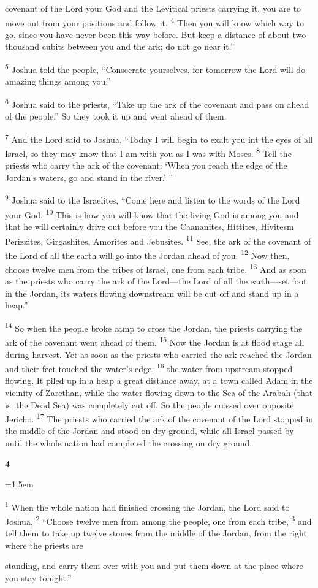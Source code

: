 \documentclass[12pt,twoside]{article}
\newcommand{\vs}[1]{\textsuperscript{#1}}
\newcommand{\chapterWithIndent}[2]{%
  \noindent
  \begin{minipage}[t]{1cm}
    \vspace{-0.4\baselineskip}
    {\fontsize{40pt}{48pt}\selectfont \textbf{#1}}
  \end{minipage}%
  \hspace{0.3cm}%
  \begin{minipage}[t]{\dimexpr\linewidth - 1.5cm - 0.3cm\relax}
    \hangindent=1.5em
    \hangafter=3
    #2
    \vspace{0.1cm}
  \end{minipage}
}
\begin{document}
\noindent covenant of the Lord your God and the Levitical priests carrying it, you are to move out from your positions and follow it.
\vs{4} Then you will know which way to go, since you have never been this way before. But keep a distance of about two thousand cubits between you and the ark; do not go near it.''

\vs{5} Joshua told the people, ``Consecrate yourselves, for tomorrow the Lord will do amazing things among you.''

\vs{6} Joshua said to the priests, ``Take up the ark of the covenant and pass on ahead of the people.'' So they took it up and went ahead of them.

\vs{7} And the Lord said to Joshua, ``Today I will begin to exalt you int the eyes of all Israel, so they may know that I am with you as I was with Moses.
\vs{8} Tell the priests who carry the ark of the covenant: `When you reach the edge of the Jordan's waters, go and stand in the river.' ''

\vs{9} Joshua said to the Israelites, ``Come here and listen to the words of the Lord your God.
\vs{10} This is how you will know that the living God is among you and that he will certainly drive out before you the Caananites, Hittites, Hivitesm Perizzites, Girgashites, Amorites and Jebusites.
\vs{11} See, the ark of the covenant of the Lord of all the earth will go into the Jordan ahead of you.
\vs{12} Now then, choose twelve men from the tribes of Israel, one from each tribe.
\vs{13} And as soon as the priests who carry the ark of the Lord---the Lord of all the earth---set foot in the Jordan, its waters flowing downstream will be cut off and stand up in a heap.''

\vs{14} So when the people broke camp to cross the Jordan, the priests carrying the ark of the covenant went ahead of them.
\vs{15} Now the Jordan is at flood stage all during harvest. Yet as soon as the priests who carried the ark reached the Jordan and their feet touched the water's edge,
\vs{16} the water from upstream stopped flowing. It piled up in a heap a great distance away, at a town called Adam in the vicinity of Zarethan, while the water flowing down to the Sea of the Arabah (that is, the Dead Sea) was completely cut off. So the people crossed over opposite Jericho.
\vs{17} The priests who carried the ark of the covenant of the Lord stopped in the middle of the Jordan and stood on dry ground, while all Israel passed by until the whole nation had completed the crossing on dry ground.

\chapterWithIndent{4}{
    \vs{1} When the whole nation had finished crossing the Jordan, the Lord said to Joshua,
    \vs{2} ``Choose twelve men from among the people, one from each tribe,
    \vs{3} and tell them to take up twelve stones from the middle of the Jordan, from the right where the priests are 
}

\noindent standing, and carry them over with you and put them down at the place where you stay tonight.''

\end{document}
